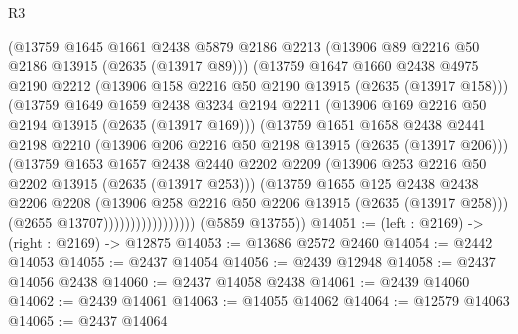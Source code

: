 \begin{lexlean}{R3}
\begin{coremodule}
                          (@13759
                            @1645
                            @1661
                            @2438
                            @5879
                            @2186
                            @2213
                            (@13906 @89 @2216 @50 @2186 @13915 (@2635 (@13917 @89)))
                            (@13759
                              @1647
                              @1660
                              @2438
                              @4975
                              @2190
                              @2212
                              (@13906 @158 @2216 @50 @2190 @13915 (@2635 (@13917 @158)))
                              (@13759
                                @1649
                                @1659
                                @2438
                                @3234
                                @2194
                                @2211
                                (@13906 @169 @2216 @50 @2194 @13915 (@2635 (@13917 @169)))
                                (@13759
                                  @1651
                                  @1658
                                  @2438
                                  @2441
                                  @2198
                                  @2210
                                  (@13906 @206 @2216 @50 @2198 @13915 (@2635 (@13917 @206)))
                                  (@13759
                                    @1653
                                    @1657
                                    @2438
                                    @2440
                                    @2202
                                    @2209
                                    (@13906 @253 @2216 @50 @2202 @13915 (@2635 (@13917 @253)))
                                    (@13759
                                      @1655
                                      @125
                                      @2438
                                      @2438
                                      @2206
                                      @2208
                                      (@13906 @258 @2216 @50 @2206 @13915 (@2635 (@13917 @258)))
                                      (@2655 @13707)))))))))))))))))
      (@5859 @13755))
@14051 := (left : @2169) -> (right : @2169) -> @12875
@14053 := @13686 @2572 @2460
@14054 := @2442 @14053
@14055 := @2437 @14054
@14056 := @2439 @12948
@14058 := @2437 @14056 @2438
@14060 := @2437 @14058 @2438
@14061 := @2439 @14060
@14062 := @2439 @14061
@14063 := @14055 @14062
@14064 := @12579 @14063
@14065 := @2437 @14064

\end{coremodule}
\end{lexlean}
